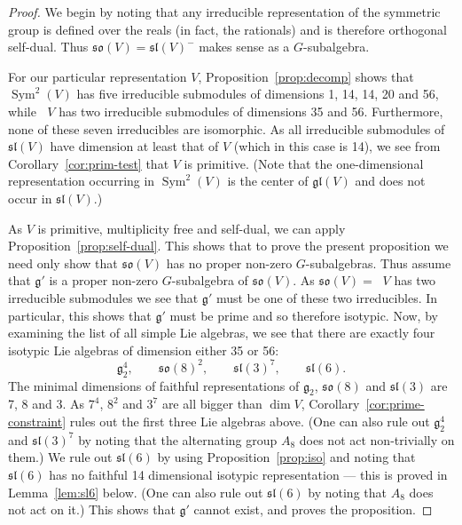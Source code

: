 \documentclass{amsart}
\theoremstyle{definition}
\theoremstyle{remark}
\DeclareMathOperator{\Sym}{Sym}
\DeclareMathOperator{\bw}{{\bigwedge}^{\! 2}}
\let\mf\mathfrak
\begin{document}
\begin{proof}
We begin by noting that any irreducible representation of the symmetric
group is defined over the reals (in fact, the rationals) and is therefore
orthogonal self-dual.  Thus $\mf{so}(V)=\mf{sl}(V)^-$ makes sense as a
$G$-subalgebra.

For our particular representation $V$, Proposition~\ref{prop:decomp} shows
that $\Sym^2(V)$ has five irreducible submodules of dimensions 1, 14, 14, 20
and 56, while $\bw{V}$ has two irreducible submodules of dimensions 35 and 56.
Furthermore, none of these seven irreducibles are isomorphic.  As all
irreducible submodules of $\mf{sl}(V)$ have dimension at least that of $V$
(which in this case is 14), we see from Corollary~\ref{cor:prim-test} that
$V$ is primitive.  (Note that the one-dimensional representation occurring
in $\Sym^2(V)$ is the center of $\mf{gl}(V)$ and does not occur in
$\mf{sl}(V)$.)

As $V$ is primitive, multiplicity free and self-dual, we can apply
Proposition~\ref{prop:self-dual}.  This shows that to prove the present
proposition we need only show that $\mf{so}(V)$ has no proper non-zero
$G$-subalgebras.  Thus assume that $\mf{g}'$ is a proper non-zero
$G$-subalgebra of $\mf{so}(V)$.  As $\mf{so}(V)=\bw{V}$ has two
irreducible submodules we see that $\mf{g}'$ must be one of these two
irreducibles.  In particular, this shows that $\mf{g}'$ must be prime and so
therefore isotypic.  Now, by examining the list of all simple Lie algebras,
 we
see that there are exactly four isotypic Lie algebras of dimension either 35
or 56:
\begin{displaymath}
\mf{g}_2^4, \qquad \mf{so}(8)^2, \qquad \mf{sl}(3)^7, \qquad \mf{sl}(6).
\end{displaymath}
The minimal dimensions of faithful representations of $\mf{g}_2$, $\mf{so}(8)$
and $\mf{sl}(3)$ are 7, 8 and 3.  As $7^4$, $8^2$ and $3^7$ are all bigger
than $\dim{V}$, Corollary~\ref{cor:prime-constraint} rules out the first
three Lie algebras above.  (One can also rule out $\mf{g}_2^4$ and
$\mf{sl}(3)^7$ by noting that the alternating group $A_8$ does not act
non-trivially on them.) We rule out $\mf{sl}(6)$ by using
Proposition~\ref{prop:iso} and noting that $\mf{sl}(6)$ has no faithful 14
dimensional isotypic representation --- this is proved in Lemma~\ref{lem:sl6}
below.  (One can also rule out $\mf{sl}(6)$ by noting that $A_8$ does not
act on it.)  This shows that $\mf{g}'$ cannot exist, and proves the
proposition.
\end{proof}
\end{document}
